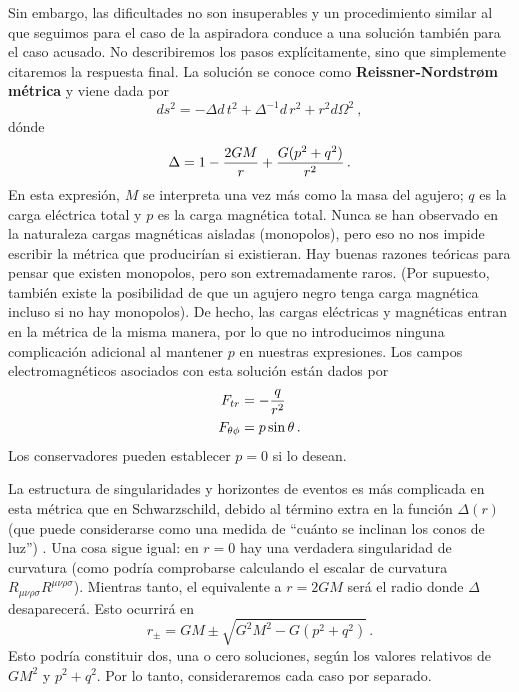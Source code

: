 \documentclass[11pt,b5paper,openany,twoside]{book}
\newcommand{\mn}{{\mu\nu}}
\begin{document}
Sin embargo, las dificultades no son insuperables y un procedimiento similar al que seguimos para el caso de la aspiradora conduce a una solución también para el caso acusado.
No describiremos los pasos explícitamente, sino que simplemente citaremos la respuesta final.
La solución se conoce como {\bf Reissner-Nordstr{\o}m métrica} y viene dada por
\begin{equation}
ds^2 = -\Delta  d\,t^2 + \Delta^{-1} d\,r^2 +
r^2d\Omega^2\ ,\label{7.110}
\end{equation}
dónde
\begin{equation}
\Delta = 1-{{2GM}\over r}+{{G(p^2+q^2)}\over{r^2}}\,.
\label{7.111}
\end{equation}
En esta expresión, $M$ se interpreta una vez más como la masa del agujero; $q$ es la carga eléctrica total y $p$ es la carga magnética total.
Nunca se han observado en la naturaleza cargas magnéticas aisladas (monopolos), pero eso no nos impide escribir la métrica que producirían si existieran.
Hay buenas razones teóricas para pensar que existen monopolos, pero son extremadamente raros.
(Por supuesto, también existe la posibilidad de que un agujero negro tenga carga magnética incluso si no hay monopolos).
De hecho, las cargas eléctricas y magnéticas entran en la métrica de la misma manera, por lo que no introducimos ninguna complicación adicional al mantener $p$ en nuestras expresiones.
Los campos electromagnéticos asociados con esta solución están dados por
\begin{align}
F_{tr}  &=  - {q\over{r^2}} \notag \\
F_{\theta\phi}  &=  p\sin\theta\,.\label{7.112}
\end{align}
Los conservadores pueden establecer $p=0$ si lo desean.

La estructura de singularidades y horizontes de eventos es más complicada en esta métrica que en Schwarzschild, debido al término extra en la función $\Delta(r)$ (que puede considerarse como una medida de ``cuánto se inclinan los conos de luz'') .
Una cosa sigue igual: en $r=0$ hay una verdadera singularidad de curvatura (como podría comprobarse calculando el escalar de curvatura $R_{\mn\rho\sigma}R^{\mn\rho\sigma}$).
Mientras tanto, el equivalente a $r=2GM$ será el radio donde $\Delta$ desaparecerá.
Esto ocurrirá en
\begin{equation}
r_\pm = GM\pm \sqrt{G^2M^2 - G(p^2+q^2)}\,.\label{7.113}
\end{equation}
Esto podría constituir dos, una o cero soluciones, según los valores relativos de $GM^2$ y $p^2+q^2$.
Por lo tanto, consideraremos cada caso por separado.
\end{document}
